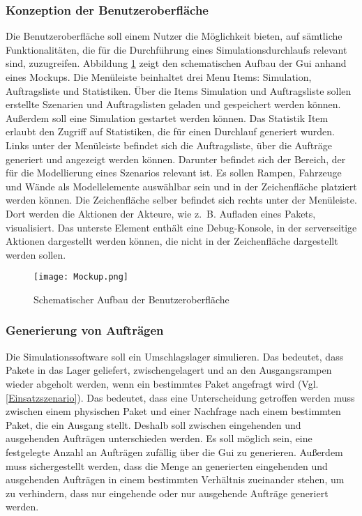 \subsubsection{Konzeption der Benutzeroberfläche}
Die Benutzeroberfläche soll einem Nutzer die Möglichkeit bieten, auf sämtliche Funktionalitäten, die für die Durchführung eines Simulationsdurchlaufs relevant sind, zuzugreifen. Abbildung \ref{GUI} zeigt den schematischen Aufbau der Gui anhand eines Mockups. Die Menüleiste beinhaltet drei Menu Items: Simulation, Auftragsliste und Statistiken. Über die Items Simulation und Auftragsliste sollen erstellte Szenarien und Auftragslisten geladen und gespeichert werden können. Außerdem soll eine Simulation gestartet werden können. Das Statistik Item erlaubt den Zugriff auf Statistiken, die für einen Durchlauf generiert wurden. Links unter der Menüleiste befindet sich die Auftragsliste, über die Aufträge generiert und angezeigt werden können. Darunter befindet sich der Bereich, der für die Modellierung eines Szenarios relevant ist. Es sollen Rampen, Fahrzeuge und Wände als Modellelemente auswählbar sein und in der Zeichenfläche platziert werden können. Die Zeichenfläche selber befindet sich rechts unter der Menüleiste. Dort werden die Aktionen der Akteure, wie z.~B. Aufladen eines Pakets, visualisiert. Das unterste Element enthält eine Debug-Konsole, in der serverseitige Aktionen dargestellt werden können, die nicht in der Zeichenfläche dargestellt werden sollen. 
\begin{figure}[h!]
	\centering
		\texttt{[image: Mockup.png]}        
		\caption{Schematischer Aufbau der Benutzeroberfläche}
	\label{GUI}
\end{figure}
\subsubsection{Generierung von Aufträgen}
Die Simulationssoftware soll ein Umschlagslager simulieren. Das bedeutet, dass Pakete in das Lager geliefert, zwischengelagert und an den Ausgangsrampen wieder abgeholt werden, wenn ein bestimmtes Paket angefragt wird (Vgl.\ref{Einsatzszenario}). Das bedeutet, dass eine Unterscheidung getroffen werden muss zwischen einem physischen Paket und einer Nachfrage nach einem bestimmten Paket, die ein Ausgang stellt. Deshalb soll zwischen eingehenden und ausgehenden Aufträgen unterschieden werden. Es soll möglich sein, eine festgelegte Anzahl an Aufträgen zufällig über die Gui zu generieren. Außerdem muss sichergestellt werden, dass die Menge an generierten eingehenden und ausgehenden Aufträgen in einem bestimmten Verhältnis zueinander stehen, um zu verhindern, dass nur eingehende oder nur ausgehende Aufträge generiert werden. 
